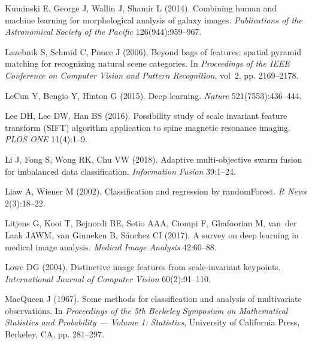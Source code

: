 \begin{thebibliography}{110}
Kuminski E, George J, Wallin J, Shamir L (2014). Combining human and machine
  learning for morphological analysis of galaxy images. \emph{Publications of
  the Astronomical Society of the Pacific} 126(944):959--967.

{\color{red}Lazebnik S, Schmid C, Ponce J (2006). Beyond bags of features: spatial pyramid
  matching for recognizing natural scene categories. In \emph{Proceedings of
  the IEEE Conference on Computer Vision and Pattern Recognition}, vol~2, pp.
  2169--2178.}

LeCun Y, Bengio Y, Hinton G (2015). Deep learning. \emph{Nature}
  521(7553):436--444.

Lee DH, Lee DW, Han BS (2016). Possibility study of scale invariant feature
  transform {(SIFT)} algorithm application to spine magnetic resonance imaging.
  \emph{PLOS ONE} 11(4):1--9.

Li J, Fong S, Wong RK, Chu VW (2018). Adaptive multi-objective swarm fusion for
  imbalanced data classification. \emph{Information Fusion} 39:1--24.

Liaw A, Wiener M (2002). Classification and regression by {randomForest}.
  \emph{R News} 2(3):18--22.

Litjens G, Kooi T, Bejnordi BE, Setio AAA, Ciompi F, Ghafoorian M, van~der Laak
  JAWM, van Ginneken B, S{\'a}nchez CI (2017). A survey on deep learning in
  medical image analysis. \emph{Medical Image Analysis} 42:60--88.

Lowe DG (2004). Distinctive image features from scale-invariant keypoints.
  \emph{International Journal of Computer Vision} 60(2):91--110.

MacQueen J (1967). Some methods for classification and analysis of multivariate
  observations. In \emph{Proceedings of the 5th Berkeley Symposium on
  Mathematical Statistics and Probability --- Volume 1: Statistics}, University
  of California Press, Berkeley, CA, pp. 281--297.


\end{thebibliography}
